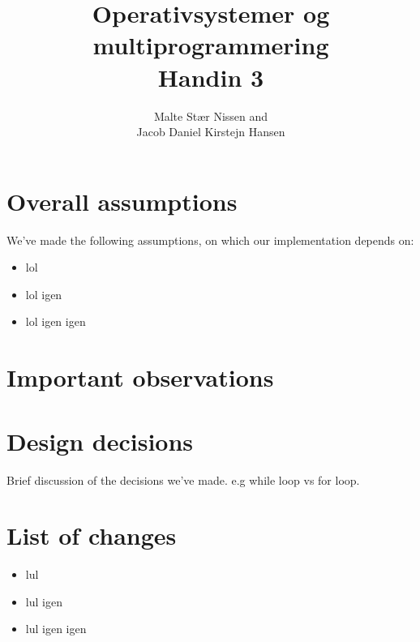 \documentclass[11pt,a4paper]{article}
\title{Operativsystemer og multiprogrammering \\ Handin 3}
\author{Malte Stær Nissen and \\ 
        Jacob Daniel Kirstejn Hansen}
\begin{document}
\maketitle

\tableofcontents
\newpage

\section{Overall assumptions}
We've made the following assumptions, on which our implementation depends on: 

\begin{itemize}
\item lol
\item lol igen
\item lol igen igen
\end{itemize}

\section{Important observations}

\section{Design decisions}
Brief discussion of the decisions we've made. e.g while loop vs for loop.

\section{List of changes}

\begin{itemize}
\item lul
\item lul igen
\item lul igen igen
\end{itemize}
\end{document}
